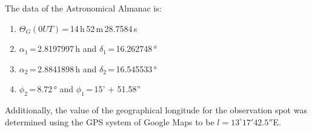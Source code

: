 The data of the Astronomical Almanac is: 

\begin{enumerate}
    \item $\Theta_G(0UT)$\,=\,14\,h\,52\,m\,28.7584\,s
    \item $\alpha_1$\,=\,2.8197997\,h and $\delta_1$\,=\,16.262748\,°
    \item $\alpha_2$\,=\,2.8841898\,h and $\delta_2$\,=\,16.545533\,°
    \item $\phi_2$\,=\,8.72\,° and $\phi_1$\,=\,15' + 51.58''
\end{enumerate}

Additionally, the value of the geographical longitude for the observation spot was determined using the GPS system of Google Maps to be $l=13^\circ 17' 42.5''$E.


%
%
